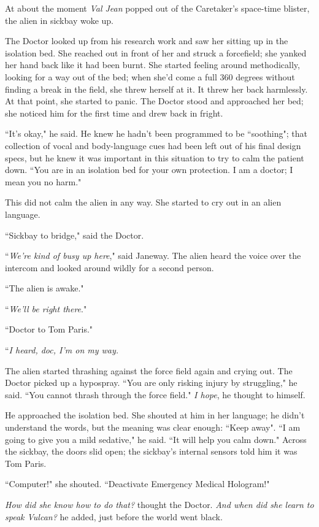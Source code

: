 \documentclass[twoside,letterpaper,12pt]{memoir}
\begin{document}
At about the moment \textit{Val Jean} popped out of the Caretaker's space-time blister, the alien in sickbay woke up. 

The Doctor looked up from his research work and saw her sitting up in the isolation bed. She reached out in front of her and struck a forcefield; she yanked her hand back like it had been burnt. She started feeling around methodically, looking for a way out of the bed; when she'd come a full 360 degrees without finding a break in the field, she threw herself at it. It threw her back harmlessly. At that point, she started to panic. The Doctor stood and approached her bed; she noticed him for the first time and drew back in fright. 

``It's okay," he said. He knew he hadn't been programmed to be ``soothing"; that collection of vocal and body-language cues had been left out of his final design specs, but he knew it was important in this situation to try to calm the patient down. ``You are in an isolation bed for your own protection. I am a doctor; I mean you no harm." 

This did not calm the alien in any way. She started to cry out in an alien language. 

``Sickbay to bridge," said the Doctor. 

``\textit{We're kind of busy up here}," said Janeway. The alien heard the voice over the intercom and looked around wildly for a second person. 

``The alien is awake." 

``\textit{We'll be right there}." 

``Doctor to Tom Paris." 

``\textit{I heard, doc, I'm on my way.} 

The alien started thrashing against the force field again and crying out. The Doctor picked up a hypospray. ``You are only risking injury by struggling," he said. ``You cannot thrash through the force field." \textit{I hope}, he thought to himself. 

He approached the isolation bed. She shouted at him in her language; he didn't understand the words, but the meaning was clear enough: ``Keep away". ``I am going to give you a mild sedative," he said. ``It will help you calm down." Across the sickbay, the doors slid open; the sickbay's internal sensors told him it was Tom Paris. 

``Computer!" she shouted. ``Deactivate Emergency Medical Hologram!" 

\textit{How did she know how to do that?} thought the Doctor. \textit{And when did she learn to speak Vulcan?} he added, just before the world went black. 
\end{document}
